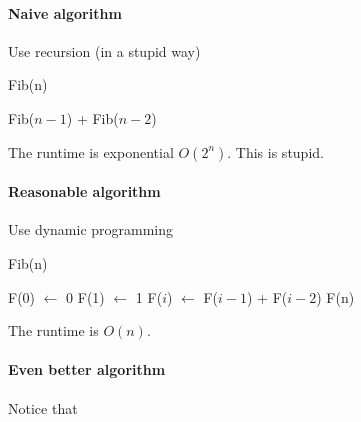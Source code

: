                 \paragraph{Naive algorithm}
                    Use recursion (in a stupid way)
                    \begin{algorithm}[H]
                        \caption{Fib(n)}
                        \begin{algorithmic}[1]
                                \State {}
                            \EndIf
                                \State {}
                            \EndIf
                            \State \Return Fib($n - 1$) + Fib($n - 2$)
                        \end{algorithmic}
                    \end{algorithm}

                    The runtime is exponential $O(2^n)$. This is stupid.

                \paragraph{Reasonable algorithm}
                    Use dynamic programming
                    \begin{algorithm}[H]
                        \caption{Fib(n)}
                        \begin{algorithmic}[1]
                            \State F(0) $\gets$ 0
                            \State F(1) $\gets$ 1
                                \State F($i$) $\gets$ F($i - 1$) + F($i - 2$)
                            \EndFor
                            \State \Return F(n)
                        \end{algorithmic}
                    \end{algorithm}

                    The runtime is $O(n)$.

                \paragraph{Even better algorithm}
                    
                    Notice that

